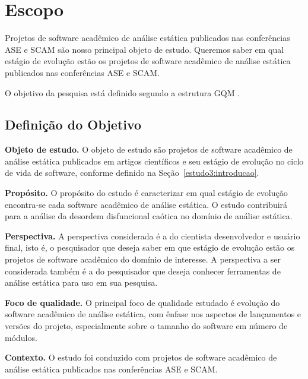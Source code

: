 \section{Escopo} \label{estudo3:escopo} %

Projetos de software acadêmico de análise estática publicados nas 
conferências ASE e SCAM 
são nosso principal objeto de estudo.
Queremos saber em qual estágio de evolução estão os projetos de software
acadêmico de análise estática publicados nas conferências ASE e SCAM.

O objetivo da pesquisa está definido segundo a estrutura GQM \cite{basili1994goal}.

\subsection{Definição do Objetivo}

\begin{description}

  \item{\bf Objeto de estudo.}
    O objeto de estudo são projetos de software acadêmico de análise estática
    publicados em artigos científicos e seu estágio de evolução no ciclo de
    vida de software, conforme definido na Seção~\ref{estudo3:introducao}.

  \item{\bf Propósito.}
    O propósito do estudo é caracterizar em qual estágio de evolução
    encontra-se cada software acadêmico de análise estática. O estudo
    contribuirá para a análise da desordem disfuncional caótica no domínio de
    análise estática. 

  \item{\bf Perspectiva.}
    A perspectiva considerada é a do cientista desenvolvedor e usuário final, isto é, o pesquisador
    que deseja saber em que estágio de evolução estão os projetos de software acadêmico do domínio
    de interesse. A perspectiva a ser considerada também é a do pesquisador que deseja
    conhecer ferramentas de análise estática para uso em sua pesquisa.

  \item{\bf Foco de qualidade.}
    O principal foco de qualidade estudado é evolução do software
    acadêmico de análise estática, com ênfase nos aspectos de lançamentos e
    versões do projeto, especialmente sobre o tamanho do software em número de
    módulos.

  \item{\bf Contexto.}
    O estudo foi conduzido com projetos de software acadêmico de análise
    estática publicados nas conferências ASE e SCAM.

\end{description}

